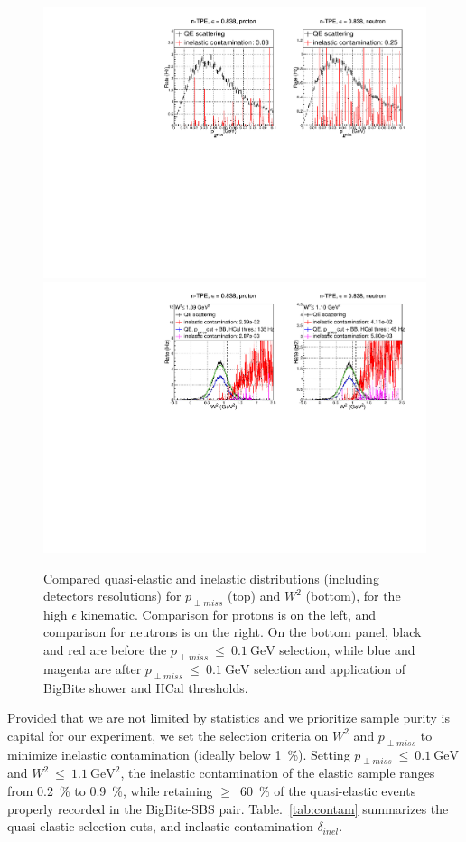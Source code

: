 \begin{figure}[h]
  \centering
    \includegraphics[width=12cm]{Plots/gen-tpe_he_pperp_acc.pdf}
    \includegraphics[width=12cm]{Plots/gen-tpe_he_W2_acc.pdf}
    \caption{Compared quasi-elastic and inelastic distributions (including detectors resolutions) for $p_{\perp miss}$ (top) and $W^2$ (bottom), for the high $\epsilon$ kinematic. Comparison for protons is on the left, and comparison for neutrons is on the right. On the bottom panel, black and red are before the $p_{\perp miss}~\leq~0.1~\mathrm{GeV}$ selection, while blue and magenta are after $p_{\perp miss}~\leq~0.1~\mathrm{GeV}$ selection and application of BigBite shower and HCal thresholds.}
    \label{fig:inel_contam_he}
\end{figure}

Provided that we are not limited by statistics and we prioritize sample purity is capital for our experiment, we set the selection criteria on $W^2$ and $p_{\perp miss}$ to minimize inelastic contamination (ideally below 1~\%). 
Setting $p_{\perp miss}~\leq~0.1~\mathrm{GeV}$ and $W^2~\leq~1.1~\mathrm{GeV}^2$, the inelastic contamination of the elastic sample ranges from 0.2~\% to 0.9~\%, while retaining $\geq$~60~\% of the quasi-elastic events properly recorded in the BigBite-SBS pair.
Table.~\ref{tab:contam} summarizes the quasi-elastic selection cuts, and inelastic contamination $\delta_{inel}$.

